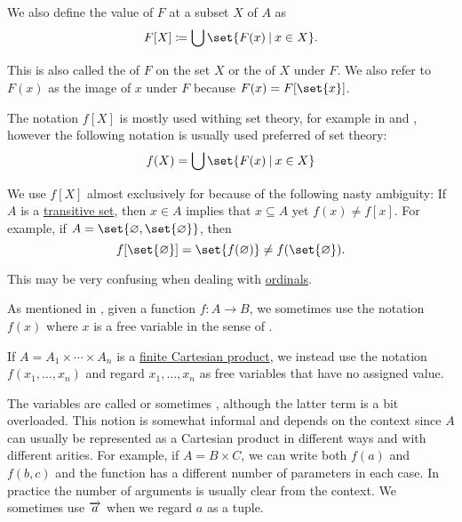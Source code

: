 \begin{definition}
\begin{thmenum}[series=def:multi_valued_function]
     We also define the value of \( F \) at a subset \( X \) of \( A \) as
    \begin{equation*}
      F[X] \coloneqq \bigcup \set{ F(x) \given x \in X }.
    \end{equation*}

    This is also called the  of \( F \) on the set \( X \) or the  of \( X \) under \( F \). We also refer to \( F(x) \) as the image of \( x \) under \( F \) because \( F(x) = F[\set{x}] \).

    The notation \( f[X] \) is mostly used withing set theory, for example in \cite[def. 2.31]{OpenLogicFull} and \cite[44]{Enderton1977Sets}, however the following notation is usually used preferred of set theory:
    \begin{equation*}
      f(X) = \bigcup \set{ F(x) \given x \in X }
    \end{equation*}

    We use \( f[X] \) almost exclusively for  because of the following nasty ambiguity: If \( A \) is a \hyperref[def:transitive_set]{transitive set}, then \( x \in A \) implies that \( x \subseteq A \) yet \( f(x) \neq f[x] \). For example, if \( A = \set{ \varnothing, \set{ \varnothing } } \), then
    \begin{equation*}
      f[\set{ \varnothing }] = \set{ f(\varnothing) } \neq f(\set{ \varnothing }).
    \end{equation*}

    This may be very confusing when dealing with \hyperref[def:ordinal]{ordinals}.

     As mentioned in , given a function \( f: A \to B \), we sometimes use the notation \( f(x) \) where \( x \) is a free variable in the sense of .

    If \( A = A_1 \times \cdots \times A_n \) is a \hyperref[def:cartesian_product/product]{finite Cartesian product}, we instead use the notation \( f(x_1, \ldots, x_n) \) and regard \( x_1, \ldots, x_n \) as free variables that have no assigned value.

    The variables are called  or sometimes , although the latter term is a bit overloaded. This notion is somewhat informal and depends on the context since \( A \) can usually be represented as a Cartesian product in different ways and with different arities. For example, if \( A = B \times C \), we can write both \( f(a) \) and \( f(b, c) \) and the function has a different number of parameters in each case. In practice the number of arguments is usually clear from the context. We sometimes use \( \overrightarrow{a} \) when we regard \( a \) as a tuple.


\end{thmenum}
\end{definition}
